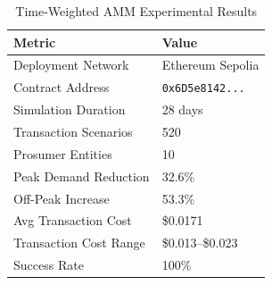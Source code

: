 
\begin{table}[h]
\centering
\caption{Time-Weighted AMM Experimental Results}
\label{tab:experimental_results}
\begin{tabular}{ll}
\hline
\textbf{Metric} & \textbf{Value} \\
\hline
Deployment Network & Ethereum Sepolia \\
Contract Address & \texttt{0x6D5e8142...} \\
Simulation Duration & 28 days \\
Transaction Scenarios & 520 \\
Prosumer Entities & 10 \\
\hline
Peak Demand Reduction & 32.6\% \\
Off-Peak Increase & 53.3\% \\
Avg Transaction Cost & \$0.0171 \\
Transaction Cost Range & \$0.013--\$0.023 \\
Success Rate & 100\% \\
\hline
\end{tabular}
\end{table}
